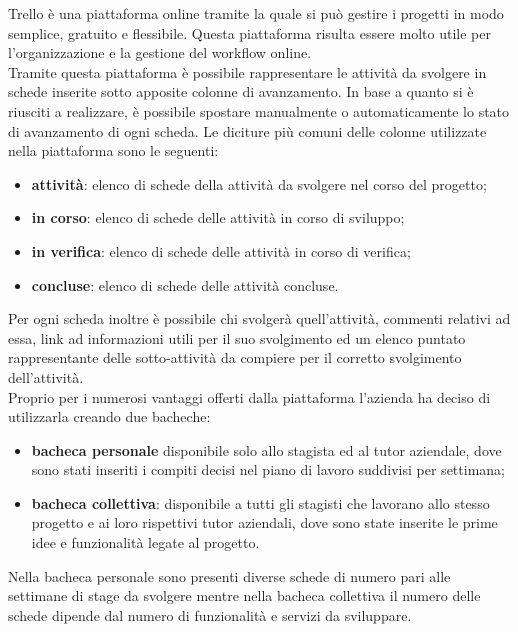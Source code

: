 Trello è una piattaforma online tramite la quale si può gestire i progetti in modo semplice, gratuito e flessibile. Questa piattaforma risulta essere molto utile per l'organizzazione e la gestione del workflow online.\\
Tramite questa piattaforma è possibile rappresentare le attività da svolgere in schede inserite sotto apposite colonne di avanzamento. In base a quanto si è riusciti a realizzare, è possibile spostare manualmente o automaticamente lo stato di avanzamento di ogni scheda. Le diciture più comuni delle colonne utilizzate nella piattaforma sono le seguenti:
\begin{itemize}
	\item \textbf{attività}: elenco di schede della attività da svolgere nel corso del progetto;
	\item \textbf{in corso}: elenco di schede delle attività in corso di sviluppo;
	\item \textbf{in verifica}: elenco di schede delle attività in corso di verifica;
	\item \textbf{concluse}: elenco di schede delle attività concluse.
\end{itemize}
Per ogni scheda inoltre è possibile chi svolgerà quell'attività, commenti relativi ad essa, link ad informazioni utili per il suo svolgimento ed un elenco puntato rappresentante delle sotto-attività da compiere per il corretto svolgimento dell'attività.\\
Proprio per i numerosi vantaggi offerti dalla piattaforma l'azienda ha deciso di utilizzarla creando due bacheche:
\begin{itemize}
	\item \textbf{bacheca personale} disponibile solo allo stagista ed al tutor aziendale, dove sono stati inseriti i compiti decisi nel piano di lavoro suddivisi per settimana;
	\item\textbf{ bacheca collettiva}: disponibile a tutti gli stagisti che lavorano allo stesso progetto e ai loro rispettivi tutor aziendali, dove sono state inserite le prime idee e funzionalità legate al progetto.
\end{itemize}
Nella bacheca personale sono presenti diverse schede di numero pari alle settimane di stage da svolgere mentre nella bacheca collettiva il numero delle schede dipende dal numero di funzionalità e servizi da sviluppare. 

